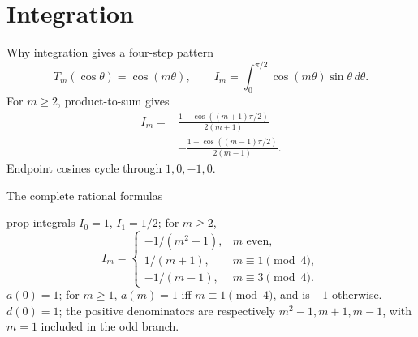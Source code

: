 \documentclass{beamer}
\begin{document}
\section{Integration}
\begin{frame}{Why integration gives a four-step pattern}
\[
T_m(\cos\theta)=\cos(m\theta),\qquad
I_m=\int_0^{\pi/2}\cos(m\theta)\sin\theta\,d\theta.
\]
For $m\ge2$, product-to-sum gives
\[
\begin{aligned}
I_m={}&\frac{1-\cos((m+1)\pi/2)}{2(m+1)}\\
&-\frac{1-\cos((m-1)\pi/2)}{2(m-1)}.
\end{aligned}
\]
Endpoint cosines cycle through $1,0,-1,0$.
\end{frame}
\begin{frame}{The complete rational formulas}
\small
\begin{bookresult}{prop-integrals}
$I_0=1$, $I_1=1/2$; for $m\ge2$,
\[
I_m=\begin{cases}-1/(m^2-1),&m\text{ even},\\1/(m+1),&m\equiv1\pmod4,\\-1/(m-1),&m\equiv3\pmod4.\end{cases}
\]
$a(0)=1$; for $m\ge1$, $a(m)=1$ iff $m\equiv1\pmod4$, and is $-1$ otherwise.
$d(0)=1$; the positive denominators are respectively $m^2-1,m+1,m-1$, with $m=1$ included in the odd branch.
\end{bookresult}
\end{frame}
\end{document}
